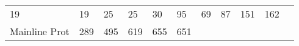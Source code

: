 \documentclass[]{article}
\begin{document}
\begin{longtable}[]{@{}lllllllllll@{}}
\begin{minipage}[t]{0.04\columnwidth}
19\strut
\end{minipage} & \begin{minipage}[t]{0.05\columnwidth}\raggedright\strut
19\strut
\end{minipage} & \begin{minipage}[t]{0.05\columnwidth}\raggedright\strut
25\strut
\end{minipage} & \begin{minipage}[t]{0.05\columnwidth}\raggedright\strut
25\strut
\end{minipage} & \begin{minipage}[t]{0.05\columnwidth}\raggedright\strut
30\strut
\end{minipage} & \begin{minipage}[t]{0.05\columnwidth}\raggedright\strut
95\strut
\end{minipage} & \begin{minipage}[t]{0.06\columnwidth}\raggedright\strut
69\strut
\end{minipage} & \begin{minipage}[t]{0.06\columnwidth}\raggedright\strut
87\strut
\end{minipage} & \begin{minipage}[t]{0.04\columnwidth}\raggedright\strut
151\strut
\end{minipage} & \begin{minipage}[t]{0.11\columnwidth}\raggedright\strut
162\strut
\end{minipage}\tabularnewline
\begin{minipage}[t]{0.14\columnwidth}\raggedright\strut
Mainline Prot\strut
\end{minipage} & \begin{minipage}[t]{0.04\columnwidth}\raggedright\strut
289\strut
\end{minipage} & \begin{minipage}[t]{0.05\columnwidth}\raggedright\strut
495\strut
\end{minipage} & \begin{minipage}[t]{0.05\columnwidth}\raggedright\strut
619\strut
\end{minipage} & \begin{minipage}[t]{0.05\columnwidth}\raggedright\strut
655\strut
\end{minipage} & \begin{minipage}[t]{0.05\columnwidth}\raggedright\strut
651\strut
\end{minipage} & \begin{minipage}[t]{0.05\columnwidth}\raggedright\strut

\end{minipage}
\end{longtable}
\end{document}
